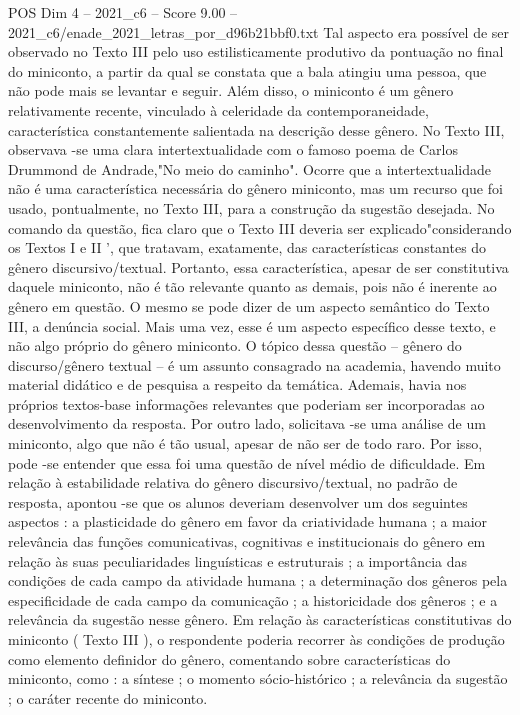 \begin{textsample}{POS Dim 4 – 2021\_c6 – Score 9.00 – 2021\_c6/enade\_2021\_letras\_por\_d96b21bbf0.txt}
Tal aspecto era possível de ser observado no Texto III pelo uso estilisticamente produtivo da pontuação no final do miniconto, a partir da qual se constata que a bala atingiu uma pessoa, que não pode mais se levantar e seguir.
Além disso, o miniconto é um gênero relativamente recente, vinculado à celeridade da contemporaneidade, característica constantemente salientada na descrição desse gênero.
No Texto III, observava -se uma clara intertextualidade com o famoso poema de Carlos Drummond de Andrade,"No meio do caminho".
Ocorre que a intertextualidade não é uma característica necessária do gênero miniconto, mas um recurso que foi usado, pontualmente, no Texto III, para a construção da sugestão desejada.
No comando da questão, fica claro que o Texto III deveria ser explicado"considerando os Textos I e II ', que tratavam, exatamente, das características constantes do gênero discursivo/textual.
Portanto, essa característica, apesar de ser constitutiva daquele miniconto, não é tão relevante quanto as demais, pois não é inerente ao gênero em questão.
O mesmo se pode dizer de um aspecto semântico do Texto III, a denúncia social.
Mais uma vez, esse é um aspecto específico desse texto, e não algo próprio do gênero miniconto.
O tópico dessa questão – gênero do discurso/gênero textual – é um assunto consagrado na academia, havendo muito material didático e de pesquisa a respeito da temática.
Ademais, havia nos próprios textos-base informações relevantes que poderiam ser incorporadas ao desenvolvimento da resposta.
Por outro lado, solicitava -se uma análise de um miniconto, algo que não é tão usual, apesar de não ser de todo raro.
Por isso, pode -se entender que essa foi uma questão de nível médio de dificuldade.
Em relação à estabilidade relativa do gênero discursivo/textual, no padrão de resposta, apontou -se que os alunos deveriam desenvolver um dos seguintes aspectos : a plasticidade do gênero em favor da criatividade humana ; a maior relevância das funções comunicativas, cognitivas e institucionais do gênero em relação às suas peculiaridades linguísticas e estruturais ; a importância das condições de cada campo da atividade humana ; a determinação dos gêneros pela especificidade de cada campo da comunicação ; a historicidade dos gêneros ; e a relevância da sugestão nesse gênero.
Em relação às características constitutivas do miniconto ( Texto III ), o respondente poderia recorrer às condições de produção como elemento definidor do gênero, comentando sobre características do miniconto, como : a síntese ; o momento sócio-histórico ; a relevância da sugestão ; o caráter recente do miniconto.

\end{textsample}
